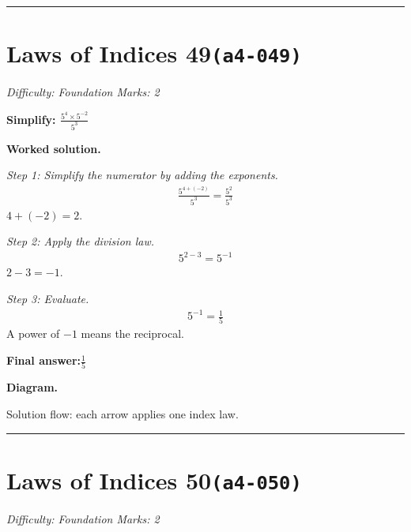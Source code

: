 \documentclass[11pt]{article}
\newcommand{\question}[1]{\par\medskip\noindent\textbf{#1}\par}
\begin{document}
\medskip\hrule

\section*{Laws of Indices 49\quad\small\texttt{(a4-049)}}
\textit{Difficulty: Foundation \quad\textbar\quad Marks: 2}

\question{Simplify: \( \frac{5^4 \times 5^{-2}}{5^3} \)}

\textbf{Worked solution.}

\textit{Step 1: Simplify the numerator by adding the exponents.}
\[\begin{gathered}
\frac{5^{4+(-2)}}{5^3} = \frac{5^{2}}{5^3}
\end{gathered}\]
\( 4 + (-2) = 2 \).

\textit{Step 2: Apply the division law.}
\[\begin{gathered}
5^{2-3} = 5^{-1}
\end{gathered}\]
\( 2 - 3 = -1 \).

\textit{Step 3: Evaluate.}
\[\begin{gathered}
5^{-1} = \frac{1}{5}
\end{gathered}\]
A power of \( -1 \) means the reciprocal.

\begin{answerbox}
\textbf{Final answer:}\quad \(\displaystyle \frac{1}{5}\)
\end{answerbox}
\textbf{Diagram.}

\begin{center}
\end{center}
\small Solution flow: each arrow applies one index law.\normalsize

\medskip\hrule

\section*{Laws of Indices 50\quad\small\texttt{(a4-050)}}
\textit{Difficulty: Foundation \quad\textbar\quad Marks: 2}
\end{document}

